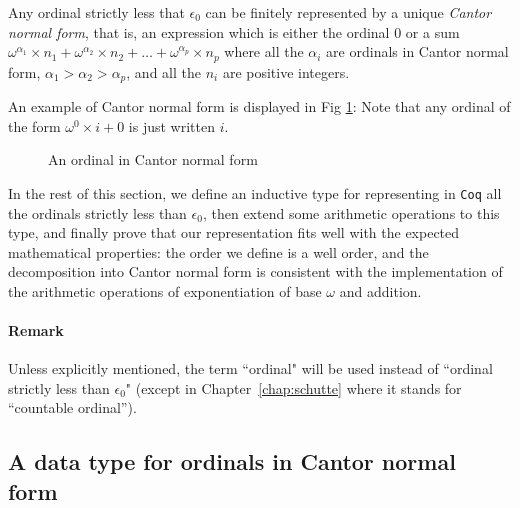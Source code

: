Any ordinal strictly less that \(\epsilon_0\) 
can be finitely represented by a unique  \emph{Cantor normal form}, 
that is, an expression  which is either  the ordinal \(0\) or 
a sum  \(\omega^{\alpha_1} \times n_1 + \omega^{\alpha_2} \times n_2 + 
  \dots + \omega^{\alpha_p} \times n_p\) where all the \(\alpha_i\) 
are ordinals in Cantor  normal form, \(\alpha_1 > \alpha_2 > \alpha_p\), 
and all the \(n_i\) are positive integers.

An example of Cantor normal form is displayed in Fig \ref{fig:cnf-example}:
Note that  any ordinal of
the form \(\omega^0 \times i + 0\) is just written \(i\).

\begin{figure}[htb]
\centering
{}
\caption{\label{fig:cnf-example}
An ordinal in Cantor normal form}
\end{figure}




In the rest of this section, we define an inductive type for representing in \texttt{Coq}
all the ordinals strictly  less than  \(\epsilon_0\), then extend some arithmetic operations
to this type, and finally prove that our representation fits well with 
the expected mathematical properties: the order we define is a well order, 
and the decomposition into Cantor normal form  is consistent 
with the implementation of the arithmetic operations of exponentiation of base \(\omega\) 
and addition.

\paragraph*{Remark}
\label{sec:orgheadline65}
Unless explicitly mentioned, the term ``ordinal" will be used instead of
``ordinal strictly less than \(\epsilon_0\)" (except in Chapter~\ref{chap:schutte} where it stands for ``countable ordinal'').



\subsection{A data type for  ordinals in Cantor normal form}
\label{sec:orgheadline72}
\label{sec:T1-inductive-def}



